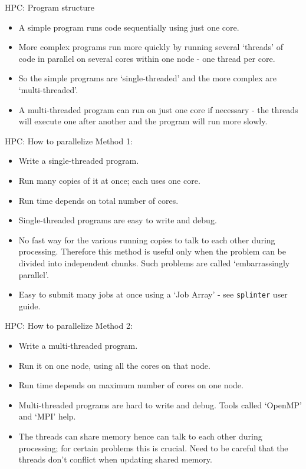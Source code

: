 \documentclass{beamer}
\begin{document}
\begin{frame}{HPC: Program structure}
  \begin{itemize}
    \item A simple program runs code sequentially using just one core.
    \item More complex programs run more quickly by running several `threads' of code in parallel on several cores within one node - one thread per core.
    \item So the simple programs are `single-threaded' and the more complex are `multi-threaded'.
    \item A multi-threaded program can run on just one core if necessary - the threads will execute one after another and the program will run more slowly.
  \end{itemize}
\end{frame}

\begin{frame}{HPC: How to parallelize}
  Method 1:
  \begin{itemize}
    \item Write a single-threaded program.
    \item Run many copies of it at once; each uses one core.
    \item Run time depends on total number of cores.
    \item Single-threaded programs are easy to write and debug.
    \item No fast way for the various running copies to talk to each other during processing. Therefore this method is useful only when the problem can be divided into independent chunks. Such problems are called `embarrassingly parallel'.
    \item Easy to submit many jobs at once using a `Job Array' - see \texttt{splinter} user guide.
  \end{itemize}
\end{frame}

\begin{frame}{HPC: How to parallelize}
  Method 2:
  \begin{itemize}
    \item Write a multi-threaded program.
    \item Run it on one node, using all the cores on that node.
    \item Run time depends on maximum number of cores on one node.
    \item Multi-threaded programs are hard to write and debug. Tools called `OpenMP' and `MPI' help.
    \item The threads can share memory hence can talk to each other during processing; for certain problems this is crucial. Need to be careful that the threads don't conflict when updating shared memory.
  \end{itemize}
\end{frame}
\end{document}
